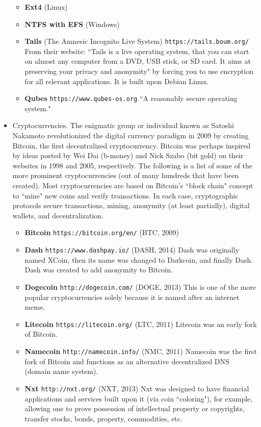 \begin{itemize}
\begin{itemize}
			\item {\bf Ext4} (Linux)
			\item {\bf NTFS with EFS} (Windows)
			\item {\bf Tails} (The Amnesic Incognito Live System) {\tt https://tails.boum.org/} From their website: ``Tails is a live operating system, that you can start on almost any computer from a DVD, USB stick, or SD card. It aims at preserving your privacy and anonymity" by forcing you to use encryption for all relevant applications. It is built upon Debian Linux.
			\item {\bf Qubes} {\tt https://www.qubes-os.org} ``A reasonably secure operating system."
		\end{itemize}
		\item Cryptocurrencies. The enigmatic group or individual known as Satoshi Nakamoto  revolutionized the digital currency paradigm in 2009 by creating Bitcoin,  the first decentralized cryptocurrency. Bitcoin was perhaps inspired by ideas posted by Wei Dai (b-money) and Nick Szabo (bit gold) on their websites in 1998 and 2005, respectively. The following is a list of some of the more prominent cryptocurrencies (out of many hundreds that have been created). Most cryptocurrencies are based on Bitcoin's ``block chain" concept to ``mine" new coins and verify transactions. In each case, cryptographic protocols secure transactions, mining, anonymity (at least partially), digital wallets, and decentralization.
		\begin{itemize}
			\item {\bf Bitcoin} {\tt https://bitcoin.org/en/} (BTC, 2009)
			\item {\bf Dash} {\tt  https://www.dashpay.io/} (DASH, 2014) Dash was originally named XCoin, then its name was changed to Darkcoin, and finally Dash. Dash was created to add anonymity to Bitcoin.
			\item {\bf Dogecoin} {\tt  http://dogecoin.com/} (DOGE, 2013) This is one of the more popular cryptocurrencies solely because it is named after an internet meme.
			\item {\bf Litecoin} {\tt  https://litecoin.org/} (LTC, 2011) Litecoin was an early fork of Bitcoin.
			\item {\bf Namecoin} {\tt  http://namecoin.info/} (NMC, 2011) Namecoin was the first fork of Bitcoin and functions as an alternative decentralized DNS (domain name system).
			\item {\bf Nxt} {\tt http://nxt.org/} (NXT, 2013) Nxt was designed to have financial applications and services built upon it (via coin ``coloring"), for example, allowing one to prove possession of intellectual property or copyrights, transfer stocks, bonds, property, commodities, etc.

\end{itemize}
\end{itemize}
